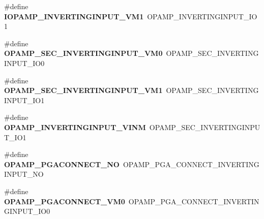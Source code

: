 \begin{DoxyCompactItemize}
\item 
\hypertarget{group___h_a_l___o_p_a_m_p___aliased___defines_ga375723a55ef087438b5614070f7daab6}{\#define {\bfseries I\-O\-P\-A\-M\-P\-\_\-\-I\-N\-V\-E\-R\-T\-I\-N\-G\-I\-N\-P\-U\-T\-\_\-\-V\-M1}~O\-P\-A\-M\-P\-\_\-\-I\-N\-V\-E\-R\-T\-I\-N\-G\-I\-N\-P\-U\-T\-\_\-\-I\-O1}\label{group___h_a_l___o_p_a_m_p___aliased___defines_ga375723a55ef087438b5614070f7daab6}

\item 
\hypertarget{group___h_a_l___o_p_a_m_p___aliased___defines_ga2deb27c0ae55e51ce5e529b8ca12a5bf}{\#define {\bfseries O\-P\-A\-M\-P\-\_\-\-S\-E\-C\-\_\-\-I\-N\-V\-E\-R\-T\-I\-N\-G\-I\-N\-P\-U\-T\-\_\-\-V\-M0}~O\-P\-A\-M\-P\-\_\-\-S\-E\-C\-\_\-\-I\-N\-V\-E\-R\-T\-I\-N\-G\-I\-N\-P\-U\-T\-\_\-\-I\-O0}\label{group___h_a_l___o_p_a_m_p___aliased___defines_ga2deb27c0ae55e51ce5e529b8ca12a5bf}

\item 
\hypertarget{group___h_a_l___o_p_a_m_p___aliased___defines_ga64e070f02a3a612aa9307cd3d7be8cb9}{\#define {\bfseries O\-P\-A\-M\-P\-\_\-\-S\-E\-C\-\_\-\-I\-N\-V\-E\-R\-T\-I\-N\-G\-I\-N\-P\-U\-T\-\_\-\-V\-M1}~O\-P\-A\-M\-P\-\_\-\-S\-E\-C\-\_\-\-I\-N\-V\-E\-R\-T\-I\-N\-G\-I\-N\-P\-U\-T\-\_\-\-I\-O1}\label{group___h_a_l___o_p_a_m_p___aliased___defines_ga64e070f02a3a612aa9307cd3d7be8cb9}

\item 
\hypertarget{group___h_a_l___o_p_a_m_p___aliased___defines_gafe28bec51c15b3c50797e6cb12e271bc}{\#define {\bfseries O\-P\-A\-M\-P\-\_\-\-I\-N\-V\-E\-R\-T\-I\-N\-G\-I\-N\-P\-U\-T\-\_\-\-V\-I\-N\-M}~O\-P\-A\-M\-P\-\_\-\-S\-E\-C\-\_\-\-I\-N\-V\-E\-R\-T\-I\-N\-G\-I\-N\-P\-U\-T\-\_\-\-I\-O1}\label{group___h_a_l___o_p_a_m_p___aliased___defines_gafe28bec51c15b3c50797e6cb12e271bc}

\item 
\hypertarget{group___h_a_l___o_p_a_m_p___aliased___defines_gae834f2fc0846277de623320d541d2b83}{\#define {\bfseries O\-P\-A\-M\-P\-\_\-\-P\-G\-A\-C\-O\-N\-N\-E\-C\-T\-\_\-\-N\-O}~O\-P\-A\-M\-P\-\_\-\-P\-G\-A\-\_\-\-C\-O\-N\-N\-E\-C\-T\-\_\-\-I\-N\-V\-E\-R\-T\-I\-N\-G\-I\-N\-P\-U\-T\-\_\-\-N\-O}\label{group___h_a_l___o_p_a_m_p___aliased___defines_gae834f2fc0846277de623320d541d2b83}

\item 
\hypertarget{group___h_a_l___o_p_a_m_p___aliased___defines_gad9238e09b6c72142f797d4a0cccef921}{\#define {\bfseries O\-P\-A\-M\-P\-\_\-\-P\-G\-A\-C\-O\-N\-N\-E\-C\-T\-\_\-\-V\-M0}~O\-P\-A\-M\-P\-\_\-\-P\-G\-A\-\_\-\-C\-O\-N\-N\-E\-C\-T\-\_\-\-I\-N\-V\-E\-R\-T\-I\-N\-G\-I\-N\-P\-U\-T\-\_\-\-I\-O0}\label{group___h_a_l___o_p_a_m_p___aliased___defines_gad9238e09b6c72142f797d4a0cccef921}


\end{DoxyCompactItemize}
